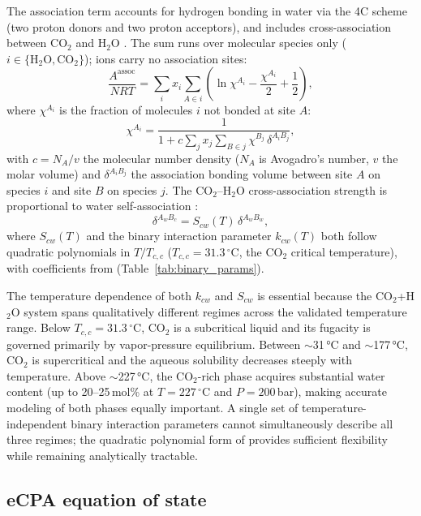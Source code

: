 \documentclass[preprint,12pt,authoryear]{elsarticle}
\begin{document}
The association term accounts for hydrogen bonding in water via the 4C scheme (two proton
donors and two proton acceptors), and includes cross-association between CO$_2$ and H$_2$O
\citep{LiFiroozabadi2009}.
The sum runs over molecular species only ($i \in \{\text{H}_2\text{O}, \text{CO}_2\}$);
ions carry no association sites:
\begin{equation}
  \frac{A^{\text{assoc}}}{NRT} = \sum_i x_i \sum_{A \in i}
    \left(\ln\chi^{A_i} - \frac{\chi^{A_i}}{2} + \frac{1}{2}\right),
  \label{eq:Aassoc}
\end{equation}
where $\chi^{A_i}$ is the fraction of molecules $i$ not bonded at site $A$:
\begin{equation}
  \chi^{A_i} = \frac{1}{1 + c \sum_j x_j \sum_{B \in j} \chi^{B_j}\,\delta^{A_iB_j}},
  \label{eq:chi}
\end{equation}
with $c = N_A/v$ the molecular number density ($N_A$ is Avogadro's number, $v$ the molar
volume) and $\delta^{A_iB_j}$ the association bonding volume between site $A$ on species
$i$ and site $B$ on species $j$.
The CO$_2$--H$_2$O cross-association strength is proportional to water self-association
\citep{Coelho2025}:
\begin{equation}
  \delta^{A_wB_c} = S_{cw}(T)\,\delta^{A_wB_w},
  \label{eq:Scw}
\end{equation}
where $S_{cw}(T)$ and the binary interaction parameter $k_{cw}(T)$ both follow quadratic
polynomials in $T/T_{c,c}$ ($T_{c,c} = 31.3\,^\circ$C, the CO$_2$ critical temperature), with
coefficients from \citet{Coelho2025} (Table~\ref{tab:binary_params}).

The temperature dependence of both $k_{cw}$ and $S_{cw}$ is essential because the CO$_2$+H$_2$O
system spans qualitatively different regimes across the validated temperature range.
Below $T_{c,c} = 31.3\,^\circ$C, CO$_2$ is a subcritical liquid and its fugacity is
governed primarily by vapor-pressure equilibrium.
Between $\sim$31\,°C and $\sim$177\,°C, CO$_2$ is supercritical and the aqueous solubility
decreases steeply with temperature.
Above $\sim$227\,°C, the CO$_2$-rich phase acquires substantial water content
(up to 20--25\,mol\% at $T = 227\,^\circ$C and $P = 200$\,bar), making accurate modeling of both
phases equally important.
A single set of temperature-independent binary interaction parameters cannot simultaneously
describe all three regimes; the quadratic polynomial form of \citet{Coelho2025} provides
sufficient flexibility while remaining analytically tractable.

\subsection{eCPA equation of state}
\label{sec:ecpa}
\end{document}
